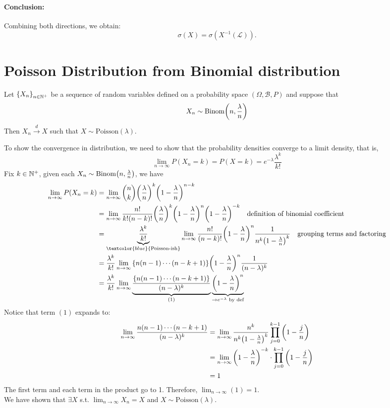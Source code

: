 \begin{prf}
\paragraph{Conclusion:}  
Combining both directions, we obtain:
\[
\sigma(X) = \sigma\left(X^{-1}(\mathcal{L})\right).
\]
	
\end{prf}


\section{Poisson Distribution from Binomial distribution}
\begin{thm}{}
Let $\qty{X_n}_{n\in \mathbb{N}^+}$ be a sequence of random variables defined on a probability space $(\Omega, \mathcal{B}, P)$ and suppose that
$$X_n\sim \mathrm{Binom}\qty(n, \frac{\lambda}{n})$$
Then $X_n\xrightarrow{d} X$ such that $X\sim \mathrm{Poisson}(\lambda)$. 
\end{thm}

\begin{prf*}
To show the convergence in distribution, we need to show that the probability densities converge to a limit density, that is, 
$$\lim_{n\to\infty} P(X_n=k) = P(X=k) = e^{-\lambda}\frac{\lambda^{k}}{k!}$$
Fix $k\in \mathbb{N}^+$, given each $X_n\sim\mathrm{Binom}\qty(n, \frac{\lambda}{n})$, we have
\begin{align*}
	\lim_{n\to\infty} P(X_n = k) &= \lim_{n\to\infty}\binom{n}{k} \qty(\frac{\lambda}{n})^{k}\qty(1-\frac{\lambda}{n})^{n-k}\\
	&= \lim_{n\to\infty}\frac{n!}{k!(n-k)!}\qty(\frac{\lambda}{n})^{k}\qty(1-\frac{\lambda}{n})^{n}\qty(1-\frac{\lambda}{n})^{-k} \quad \text{definition of binomial coefficient}\\
	&= \underbrace{\frac{\lambda^k}{k!}}_{\textcolor{blue}{\text{Poisson-ish}}}\lim_{n\to\infty}\frac{n!}{(n-k)!}\qty(1-\frac{\lambda}{n})^{n}\frac{1}{n^k\qty(1-\frac{\lambda}{n})^k} \quad \text{grouping terms and factoring}\\
	&= \frac{\lambda^k}{k!}\lim_{n\to\infty}\qty{n(n-1)\cdots(n-k+1)}\qty(1-\frac{\lambda}{n})^{n}\frac{1}{(n-\lambda)^k}\\
	&= \frac{\lambda^k}{k!}\lim_{n\to\infty}\underbrace{\frac{\qty{n(n-1)\cdots(n-k+1)}}{(n-\lambda)^k}}_{(1)}\underbrace{\qty(1-\frac{\lambda}{n})^{n}}_{\rightarrow e^{-\lambda} \text{ by def}}
\end{align*}
Notice that term $(1)$ expands to: 
\begin{align*}
	\lim_{n\to\infty} \frac{n(n-1)\cdots(n-k+1)}{(n-\lambda)^k} &= \lim_{n\to\infty} \frac{n^k}{n^k \qty(1 - \frac{\lambda}{n})^k} \prod_{j=0}^{k-1} \qty(1 - \frac{j}{n})\\
	&= \lim_{n\to\infty} \qty(1-\frac{\lambda}{n})^{-k}\cdot \prod_{j=0}^{k-1} \qty(1 - \frac{j}{n})\\
	&= 1
\end{align*}
The first term and each term in the product go to 1. Therefore, $\lim_{n\to\infty}(1) = 1$.\\

\noindent We have shown that $\exists X$ s.t. $\lim_{n\to\infty} X_n = X$ and $X\sim \mathrm{Poisson}(\lambda)$. 
\end{prf*}


